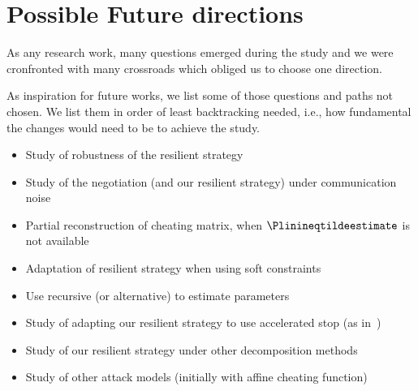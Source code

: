 \documentclass[../main.tex]{subfiles}
\begin{document}
\section{Possible Future directions}
As any research work, many questions emerged during the study and we were cronfronted with many crossroads which obliged us to choose one direction.

As inspiration for future works, we list some of those questions and paths not chosen. We list them in order of least backtracking needed, i.e., how fundamental the changes would need to be to achieve the study.
\begin{itemize}
  \item Study of robustness of the resilient strategy
  \item Study of the negotiation (and our resilient strategy) under communication noise
  \item Partial reconstruction of cheating matrix, when $\Plinineqtildeestimate$ is not available
  \item Adaptation of resilient strategy when using soft constraints~\cite{AlessioBemporad2009}
  \item Use recursive \EM{} (or alternative) to estimate parameters
  \item Study of adapting our resilient strategy to use accelerated stop (as in~\cite{DaiEtAl2017})
  \item Study of our resilient strategy under other decomposition methods
  \item Study of other attack models (initially with affine cheating function)
\end{itemize}
\end{document}
